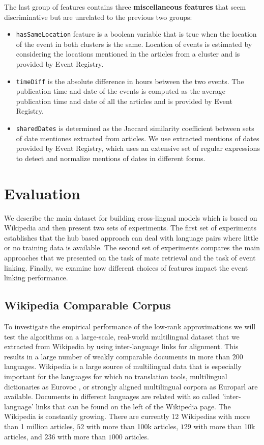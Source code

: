 \documentclass[twoside,11pt]{article}
\begin{document}
The last group of features contains three {\bf miscellaneous features} that seem discriminative but are unrelated to the previous two groups:
\begin{itemize}
\item \texttt{hasSameLocation} feature is a boolean variable that is true when the location of the event in both clusters is the same. Location of events is estimated by considering the locations mentioned in the articles from a cluster and is provided by Event Registry.
\item \texttt{timeDiff} is the absolute difference in hours between the two events. The publication time and date of the events is computed as the average publication time and date of all the articles and is provided by Event Registry.
\item \texttt{sharedDates} is determined as the Jaccard similarity coefficient between sets of date mentiones extracted from articles. We use extracted mentions of dates provided by Event Registry, which uses an extensive set of regular expressions to detect and normalize mentions of dates in different forms.
\end{itemize}


\section{Evaluation}

We describe the main dataset for building cross-lingual models which is based on Wikipedia and then present two sets of experiments. The first set of experiments
establishes that the hub based approach can deal with language pairs where little or no training data is available. The second set of experiments compares the main approaches
that we presented on the task of mate retrieval and the task of event linking. Finally, we examine how different choices of features impact the event linking performance.

\subsection{Wikipedia Comparable Corpus}

To investigate the empirical performance of the low-rank approximations we will test the algorithms on a large-scale, real-world multilingual dataset that we extracted from Wikipedia by using inter-language links for alignment. This  results in a large number of weakly comparable documents in more than $200$ languages. Wikipedia is a large source of multilingual data that is especially important for the languages for which no translation tools, multilingual dictionaries as Eurovoc \cite{eurovoc}, or strongly aligned multilingual corpora as Europarl \cite{europarl} are available. Documents in different languages are related with so called 'inter-language' links that can be found on the left of the Wikipedia page. The Wikipedia is constantly growing. There are currently 12 Wikipedias with more than 1 million %
 articles, $52$ with more than 100k %
 articles, $129$ with more than 10k articles, and $236$ with more than $1000$ articles.
\end{document}
